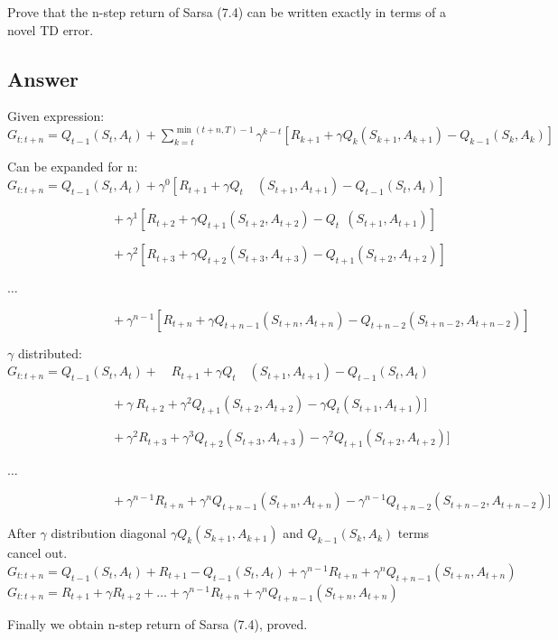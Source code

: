 \documentclass[11pt]{article}
\begin{document}
    Prove that the n-step return of Sarsa (7.4) can be written exactly in terms of a novel TD error.

    \subsection*{Answer}

    Given expression:
    \newline
    $ G_{t:t+n} = Q_{t-1}(S_t , A_t) + \sum_{ k=t}^{\min(t+n, T) - 1} \gamma^{k-t} [R_{k+1} + \gamma Q_{k}(S_{k+1} , A_{k+1}) - Q_{k-1}(S_{k} , A_{k}) ]  $
    \newline

    Can be expanded for n:
    \newline
    $ G_{t:t+n} = Q_{t-1}(S_t , A_t) + \gamma^{0} [R_{t+1} + \gamma Q_{t}\quad(S_{t+1} , A_{t+1}) - Q_{t-1}(S_{t} , A_{t}) ] $

    $  \qquad\qquad\qquad\qquad\  + \gamma^{1} [R_{t+2} + \gamma Q_{t+1}(S_{t+2} , A_{t+2}) - Q_{t}\ \ (S_{t+1} , A_{t+1}) ] $

    $  \qquad\qquad\qquad\qquad\  + \gamma^{2} [R_{t+3} + \gamma Q_{t+2}(S_{t+3} , A_{t+3}) - Q_{t+1}(S_{t+2} , A_{t+2}) ] $

    $ \dots $

     $  \qquad\qquad\qquad\qquad\  + \gamma^{n-1} [R_{t+n} + \gamma Q_{t+n-1}(S_{t+n} , A_{t+n}) - Q_{t+n-2}(S_{t+n-2} , A_{t+n-2}) ] $

    $\gamma$ distributed:
     \newline
    $ G_{t:t+n} = Q_{t-1}(S_t , A_t) + \quad R_{t+1} + \gamma Q_{t}\quad(S_{t+1} , A_{t+1}) - Q_{t-1}(S_{t} , A_{t})  $

    $  \qquad\qquad\qquad\qquad\  + \gamma \ R_{t+2} + \gamma^2 Q_{t+1}(S_{t+2} , A_{t+2}) - \gamma Q_{t}(S_{t+1} , A_{t+1}) ] $

    $  \qquad\qquad\qquad\qquad\  + \gamma^{2} R_{t+3} + \gamma^{3} Q_{t+2}(S_{t+3} , A_{t+3}) - \gamma^{2} Q_{t+1}(S_{t+2} , A_{t+2}) ] $

    $ \dots $

     $  \qquad\qquad\qquad\qquad\  + \gamma^{n-1} R_{t+n} + \gamma^{n} Q_{t+n-1}(S_{t+n} , A_{t+n}) - \gamma^{n-1} Q_{t+n-2}(S_{t+n-2} , A_{t+n-2}) ] $

    After $\gamma$ distribution diagonal $\gamma Q_{k}(S_{k+1} , A_{k+1}) $ and $ Q_{k-1}(S_{k} , A_{k}) $ terms cancel out.
    \newline
    $ G_{t:t+n} = Q_{t-1}(S_t , A_t) + R_{t+1} - Q_{t-1}(S_{t} , A_{t}) + \gamma^{n-1} R_{t+n} + \gamma^{n} Q_{t+n-1}(S_{t+n} , A_{t+n}) $
    \newline
    $ G_{t:t+n} = R_{t+1} + \gamma R_{t+2} + \dots + \gamma^{n-1} R_{t+n} + \gamma^{n} Q_{t+n-1}(S_{t+n} , A_{t+n}) $
    \newline

    Finally we obtain n-step return of Sarsa (7.4), proved.
\end{document}
